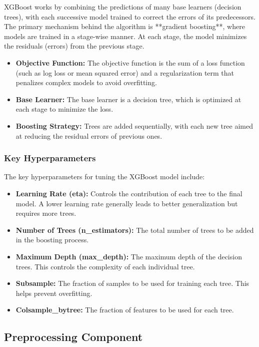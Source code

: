 \documentclass[15pt]{article}
\begin{document}
XGBoost works by combining the predictions of many base learners (decision trees), with each successive model trained to correct the errors of its predecessors. The primary mechanism behind the algorithm is **gradient boosting**, where models are trained in a stage-wise manner. At each stage, the model minimizes the residuals (errors) from the previous stage.

\begin{itemize}
    \item \textbf{Objective Function:} The objective function is the sum of a loss function (such as log loss or mean squared error) and a regularization term that penalizes complex models to avoid overfitting.
    \item \textbf{Base Learner:} The base learner is a decision tree, which is optimized at each stage to minimize the loss.
    \item \textbf{Boosting Strategy:} Trees are added sequentially, with each new tree aimed at reducing the residual errors of previous ones.
\end{itemize}

\subsubsection{Key Hyperparameters}

The key hyperparameters for tuning the XGBoost model include:

\begin{itemize}
    \item \textbf{Learning Rate (eta):} Controls the contribution of each tree to the final model. A lower learning rate generally leads to better generalization but requires more trees.
    \item \textbf{Number of Trees (n\_estimators):} The total number of trees to be added in the boosting process.
    \item \textbf{Maximum Depth (max\_depth):} The maximum depth of the decision trees. This controls the complexity of each individual tree.
    \item \textbf{Subsample:} The fraction of samples to be used for training each tree. This helps prevent overfitting.
    \item \textbf{Colsample\_bytree:} The fraction of features to be used for each tree.
\end{itemize}

\subsection{Preprocessing Component}
\end{document}
